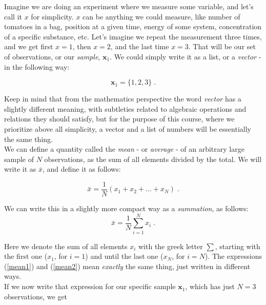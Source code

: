 \documentclass{book}
\begin{document}
Imagine we are doing an experiment where we measure some variable, and let's call it $x$ for simplicity. $x$ can be anything we could measure, like number of tomatoes in a bag, position at a given time, energy of some system, concentration of a specific substance, etc. Let's imagine we repeat the measurement three times, and we get first $x = 1$, then $x = 2$, and the last time $x = 3$. That will be our set of observations, or our \textit{sample}, $\textbf{x}_{1}$. We could simply write it as a list, or a \textit{vector} - in the following way:

\begin{equation}
\textbf{x}_{1} = \{1, 2, 3\} \; . \nonumber  
\end{equation}

Keep in mind that from the mathematics perspective the word \textit{vector} has a slightly different meaning, with subtleties related to algebraic operations and relations they should satisfy, but for the purpose of this course, where we prioritize above all simplicity, a vector and a list of numbers will be essentially the same thing.\\

We can define a quantity called the \textit{mean} - or \textit{average} - of an arbitrary large sample of $N$ observations, as the sum of all elements divided by the total. We will write it as $\bar{x}$, and define it as follows:

\begin{equation}
\bar{x} = \frac{1}{N} (x_{1} + x_{2} + ... + x_{N}) \; .
\label{mean1}
\end{equation}

We can write this in a slightly more compact way as a \textit{summation}, as follows:\\

\begin{equation}
\bar{x} = \frac{1}{N} \sum_{i = 1}^{N} x_{i} \; .
\label{mean2}
\end{equation}

Here we denote the sum of all elements $x_{i}$ with the greek letter $\sum$, starting with the first one ($x_1$, for $i = 1$) and until the last one ($x_N$, for $i = N$). The expressions (\ref{mean1}) and (\ref{mean2}) mean \textit{exactly} the same thing, just written in different ways.\\

If we now write that expression for our specific sample $\textbf{x}_{1}$, which has just $N = 3$ observations, we get
\end{document}
